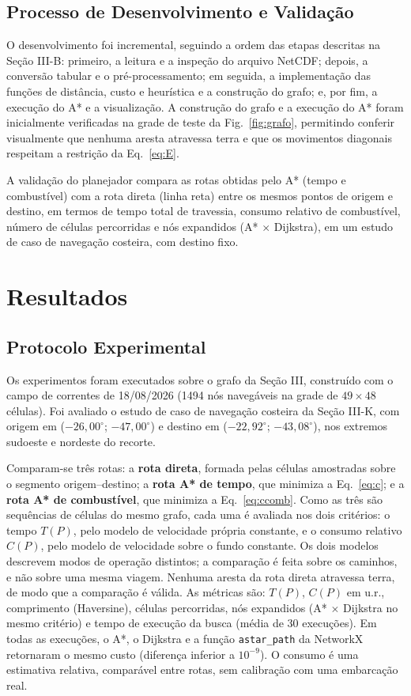 \documentclass[conference]{IEEEtran}
\begin{document}
\subsection{Processo de Desenvolvimento e Validação}
O desenvolvimento foi incremental, seguindo a ordem das etapas descritas na Seção III-B: primeiro, a leitura e a inspeção do arquivo NetCDF; depois, a conversão tabular e o pré-processamento; em seguida, a implementação das funções de distância, custo e heurística e a construção do grafo; e, por fim, a execução do A* e a visualização. A construção do grafo e a execução do A* foram inicialmente verificadas na grade de teste da Fig.~\ref{fig:grafo}, permitindo conferir visualmente que nenhuma aresta atravessa terra e que os movimentos diagonais respeitam a restrição da Eq.~\ref{eq:E}.

A validação do planejador compara as rotas obtidas pelo A* (tempo e combustível) com a rota direta (linha reta) entre os mesmos pontos de origem e destino, em termos de tempo total de travessia, consumo relativo de combustível, número de células percorridas e nós expandidos (A* $\times$ Dijkstra), em um estudo de caso de navegação costeira, com destino fixo.

\section{Resultados}
\subsection{Protocolo Experimental}
Os experimentos foram executados sobre o grafo da Seção III, construído com o campo de correntes de 18/08/2026 (1494 nós navegáveis na grade de $49 \times 48$ células). Foi avaliado o estudo de caso de navegação costeira da Seção III-K, com origem em ($-26{,}00^\circ$; $-47{,}00^\circ$) e destino em ($-22{,}92^\circ$; $-43{,}08^\circ$), nos extremos sudoeste e nordeste do recorte.

Comparam-se três rotas: a \textbf{rota direta}, formada pelas células amostradas sobre o segmento origem--destino; a \textbf{rota A* de tempo}, que minimiza a Eq.~\ref{eq:c}; e a \textbf{rota A* de combustível}, que minimiza a Eq.~\ref{eq:ccomb}. Como as três são sequências de células do mesmo grafo, cada uma é avaliada nos dois critérios: o tempo $T(P)$, pelo modelo de velocidade própria constante, e o consumo relativo $C(P)$, pelo modelo de velocidade sobre o fundo constante. Os dois modelos descrevem modos de operação distintos; a comparação é feita sobre os caminhos, e não sobre uma mesma viagem. Nenhuma aresta da rota direta atravessa terra, de modo que a comparação é válida. As métricas são: $T(P)$, $C(P)$ em u.r., comprimento (Haversine), células percorridas, nós expandidos (A* $\times$ Dijkstra no mesmo critério) e tempo de execução da busca (média de 30 execuções). Em todas as execuções, o A*, o Dijkstra e a função \texttt{astar\_path} da NetworkX retornaram o mesmo custo (diferença inferior a $10^{-9}$). O consumo é uma estimativa relativa, comparável entre rotas, sem calibração com uma embarcação real.
\end{document}
